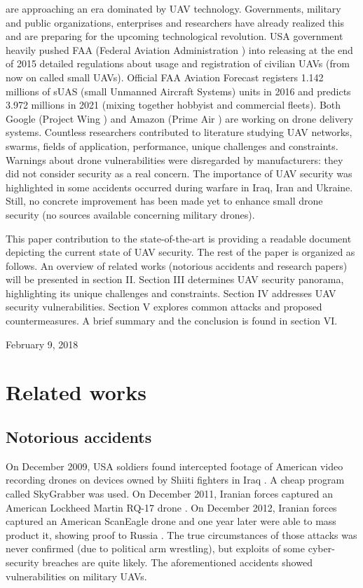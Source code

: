 \documentclass[journal]{IEEEtran}
\begin{document}
 are approaching an era dominated by UAV technology. Governments, military and public organizations, enterprises and researchers have already realized this and are preparing for the upcoming technological revolution. USA government heavily pushed FAA (Federal Aviation Administration \cite{faa}) into releasing at the end of 2015 detailed regulations about usage and registration of civilian UAVs (from now on called small UAVs). Official FAA Aviation Forecast \cite{faaforecast} registers 1.142 millions of sUAS (small Unmanned Aircraft Systems) units in 2016 and predicts 3.972 millions in 2021 (mixing together hobbyist and commercial fleets). Both Google (Project Wing \cite{pwing}) and Amazon (Prime Air \cite{primeair}) are working on drone delivery systems. Countless researchers contributed to literature studying UAV networks, swarms, fields of application, performance, unique challenges and constraints. Warnings about drone vulnerabilities were disregarded by manufacturers: they did not consider security as a real concern. The importance of UAV security was highlighted in some accidents occurred during warfare in Iraq, Iran and Ukraine. Still, no concrete improvement has been made yet to enhance small drone security (no sources available concerning military drones).

This paper contribution to the state-of-the-art is providing a readable document depicting the current state of UAV security. The rest of the paper is organized as follows. An overview of related works (notorious accidents and research papers) will be presented in section II. Section III determines UAV security panorama, highlighting its unique challenges and constraints. Section IV addresses UAV security vulnerabilities. Section V explores common attacks and proposed countermeasures. A brief summary and the conclusion is found in section VI.
 
\hfill February 9, 2018

\section{Related works}

\subsection{Notorious accidents}

On December 2009, USA soldiers found intercepted footage of American video recording drones on devices owned by Shiiti fighters in Iraq \cite{iraqaccident}. A cheap program called SkyGrabber was used. On December 2011, Iranian forces captured an American Lockheed Martin RQ-17 drone \cite{lockheedaccident}. On December 2012, Iranian forces captured an American ScanEagle drone and one year later were able to mass product it, showing proof to Russia \cite{scaneagleaccident}. The true circumstances of those attacks was never confirmed (due to political arm wrestling), but exploits of some cyber-security breaches are quite likely. The aforementioned accidents showed vulnerabilities on military UAVs.
\end{document}
